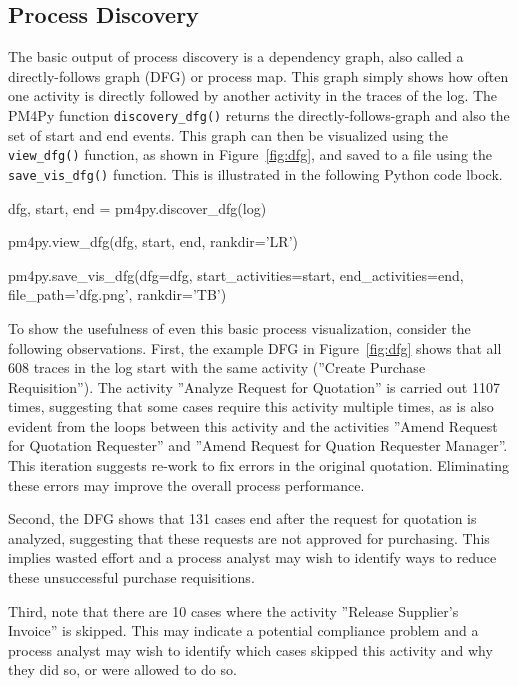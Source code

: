 \subsection*{Process Discovery}

The basic output of process discovery is a dependency graph, also called a directly-follows graph (DFG) or process map. This graph simply shows how often one activity is directly followed by another activity in the traces of the log. The PM4Py function \texttt{discovery\_dfg()} returns the directly-follows-graph and also the set of start and end events. This graph can then be visualized using the \texttt{view\_dfg()} function, as shown in Figure~\ref{fig:dfg}, and saved to a file using the \texttt{save\_vis\_dfg()} function. This is illustrated in the following Python code lbock.

\begin{pythoncode}
dfg, start, end = pm4py.discover_dfg(log)

pm4py.view_dfg(dfg, start, end, rankdir='LR')

pm4py.save_vis_dfg(dfg=dfg,
    start_activities=start, end_activities=end, 
    file_path='dfg.png', rankdir='TB')
\end{pythoncode}

To show the usefulness of even this basic process visualization, consider the following observations. First, the example DFG in Figure~\ref{fig:dfg} shows that all 608 traces in the log start with the same activity (''Create Purchase Requisition''). The activity ''Analyze Request for Quotation'' is carried out 1107 times, suggesting that some cases require this activity multiple times, as is also evident from the loops between this activity and the activities ''Amend Request for Quotation Requester'' and ''Amend Request for Quation Requester Manager''. This iteration suggests re-work to fix errors in the original quotation. Eliminating these errors may improve the overall process performance. 

Second, the DFG shows that 131 cases end after the request for quotation is analyzed, suggesting that these requests are not approved for purchasing. This implies wasted effort and a process analyst may wish to identify ways to reduce these unsuccessful purchase requisitions. 

Third, note that there are 10 cases where the activity ''Release Supplier's Invoice'' is skipped. This may indicate a potential compliance problem and a process analyst may wish to identify which cases skipped this activity and why they did so, or were allowed to do so.

